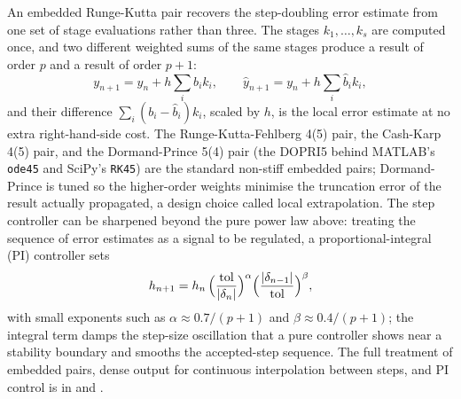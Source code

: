 \begin{mastery}
An embedded Runge-Kutta pair recovers the step-doubling error estimate
from one set of stage evaluations rather than three. The stages
$k_{1}, \ldots, k_{s}$ are computed once, and two different weighted
sums of the same stages produce a result of order $p$ and a result of
order $p+1$:
\[
y_{n+1} = y_{n} + h \sum_{i} b_{i} k_{i}, \qquad
\hat{y}_{n+1} = y_{n} + h \sum_{i} \hat{b}_{i} k_{i},
\]
and their difference $\sum_{i} (b_{i} - \hat{b}_{i}) k_{i}$, scaled by
$h$, is the local error estimate at no extra right-hand-side cost.
The Runge-Kutta-Fehlberg 4(5) pair, the Cash-Karp 4(5) pair, and the
Dormand-Prince 5(4) pair (the DOPRI5 behind MATLAB's \texttt{ode45}
and SciPy's \texttt{RK45}) are the standard non-stiff embedded pairs;
Dormand-Prince is tuned so the higher-order weights minimise the
truncation error of the result actually propagated, a design choice
called local extrapolation. The step controller can be sharpened
beyond the pure power law above: treating the sequence of error
estimates as a signal to be regulated, a proportional-integral (PI)
controller sets
\[
h_{n+1} = h_{n}\,
\Bigl(\frac{\text{tol}}{|\delta_{n}|}\Bigr)^{\alpha}
\Bigl(\frac{|\delta_{n-1}|}{\text{tol}}\Bigr)^{\beta},
\]
with small exponents such as $\alpha \approx 0.7/(p+1)$ and
$\beta \approx 0.4/(p+1)$; the integral term damps the step-size
oscillation that a pure controller shows near a stability boundary and
smooths the accepted-step sequence. The full treatment of embedded
pairs, dense output for continuous interpolation between steps, and PI
control is in \textcite{text:v2ch07-hairer-norsett-wanner} and
\textcite{text:v2ch07-shampine-gladwell-thompson}.
\end{mastery}

